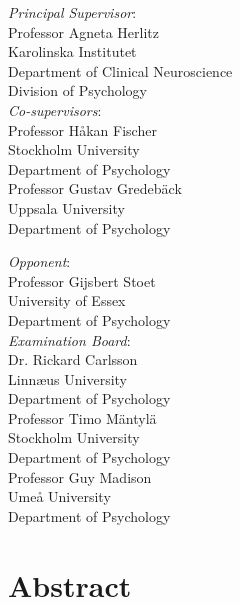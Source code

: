 ﻿\documentclass[12pt,twoside,]{article}
\begin{document}
\begin{paracol}{2}

\begin{flushleft}
	\emph{Principal Supervisor}:\\
	Professor Agneta Herlitz \\
	Karolinska Institutet \\
	Department of Clinical Neuroscience \\
	Division of Psychology \\
	\vspace{\baselineskip}
	\emph{Co-supervisors}:\\
	Professor Håkan Fischer \\
	Stockholm University \\
	Department of Psychology \\
	\vspace{\baselineskip}
	Professor Gustav Gredebäck \\
	Uppsala University \\
	Department of Psychology
\end{flushleft}

\switchcolumn

\begin{flushleft}
	\emph{Opponent}: \\
	Professor Gijsbert Stoet \\
	University of Essex \\
	Department of Psychology \\
	\vspace{\baselineskip}
	\emph{Examination Board}: \\
	Dr. Rickard Carlsson \\
	Linnæus University \\
	Department of Psychology \\
	\vspace{\baselineskip}
	Professor Timo Mäntylä \\
	Stockholm University \\
	Department of Psychology \\
	\vspace{\baselineskip}
	Professor Guy Madison \\
	Umeå University \\
	Department of Psychology
\end{flushleft}

\end{paracol}

\newpage
\thispagestyle{empty}
\section*{Abstract}
\end{document}
